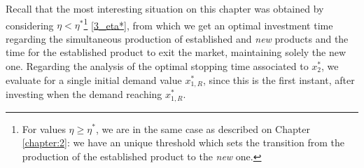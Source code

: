 Recall that the most interesting situation on this chapter was obtained by considering $\eta<\eta^*$\footnote{For values $\eta \geq \eta^*$, we are in the same case as described on Chapter \ref{chapter:2}: we have an unique threshold which sets the transition from the production of the established product to the \textit{new} one.}
\eqref{3_eta*}, from which we get an optimal investment time regarding the simultaneous production of established and \textit{new} products and the time for the established product to exit the market, maintaining solely the new one. Regarding the analysis of the optimal stopping time associated to $x_2^*$, we evaluate for a single initial demand value $x_{1,R}^*$, since this is the first instant, after investing when the demand reaching $x_{1,R}^*$.





		



